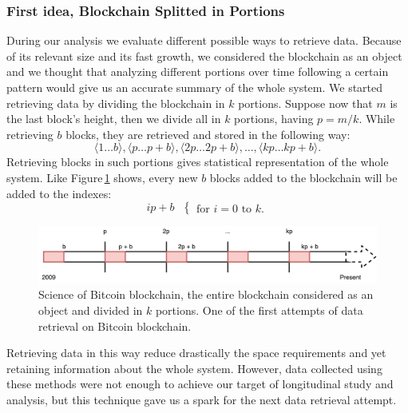 \documentclass[USenglish]{uit-thesis}
\begin{document}
\subsubsection{First idea, Blockchain Splitted in Portions}
During our analysis we evaluate different possible ways
to retrieve data. Because of its relevant size
and its fast growth, we considered the blockchain as
an object and we thought that analyzing different
portions over time following a certain pattern would
give us an accurate summary of the whole system. We
started retrieving data by dividing the blockchain in
$k$ portions.
Suppose now that $m$ is the last
block's height, then we divide
all in $k$ portions, having $p = m / k$.
While retrieving $b$ blocks, they are
retrieved and stored in the following way:
\[\langle 1 \dots b\rangle, \langle p \dots p+b\rangle, \langle 2p \dots 2p + b \rangle, \dots , \langle kp \dots kp+b\rangle.\]
Retrieving blocks in such portions gives
statistical representation of the whole system.
Like Figure\,\ref{fig:portions} shows,
every new $b$ blocks added to the
blockchain will be added to the indexes:
\begin{equation}
ip + b\textrm{ }
\begin{cases}
\textrm{for } i = 0 \textrm{ to } k.
\end{cases}
\end{equation}
\begin{figure}[h]
	\centering
	\includegraphics[width=1\textwidth]{img/portions}
	\caption{Science of Bitcoin blockchain, the entire blockchain considered as
		an object and divided in $k$ portions. One of the first attempts of data
	retrieval on Bitcoin blockchain.}
	\label{fig:portions}
\end{figure}
Retrieving data in this way reduce drastically the space requirements
and yet retaining information about the whole system. However, data
collected using these methods were not enough to achieve
our target of longitudinal study and analysis,
but this technique gave us
a spark for the next data retrieval attempt.
\end{document}
